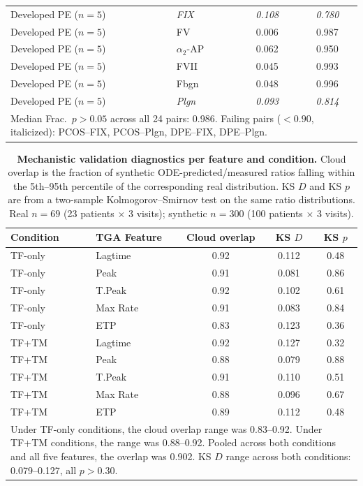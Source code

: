 \begin{table}[ht]
\begin{tabular}{llcc}
Developed PE ($n{=}5$) & \textit{FIX}     & \textit{0.108} & \textit{0.780} \\
Developed PE ($n{=}5$) & FV      & 0.006 & 0.987 \\
Developed PE ($n{=}5$) & $\alpha_2$-AP & 0.062 & 0.950 \\
Developed PE ($n{=}5$) & FVII    & 0.045 & 0.993 \\
Developed PE ($n{=}5$) & Fbgn    & 0.048 & 0.996 \\
Developed PE ($n{=}5$) & \textit{Plgn}    & \textit{0.093} & \textit{0.814} \\
\bottomrule
\multicolumn{4}{p{0.95\textwidth}}{\small Median Frac.\ $p > 0.05$ across all 24 pairs: 0.986. Failing
pairs ($< 0.90$, italicized): PCOS--FIX, PCOS--Plgn, DPE--FIX, DPE--Plgn.}
\end{tabular}
\end{table}

\begin{table}[ht]
\centering
\caption{\textbf{Mechanistic validation diagnostics per feature and
condition.} Cloud overlap is the fraction of synthetic ODE-predicted/measured
ratios falling within the 5th--95th percentile of the corresponding real
distribution. KS $D$ and KS $p$ are from a two-sample Kolmogorov--Smirnov test
on the same ratio distributions. Real $n{=}69$ (23 patients $\times$ 3 visits);
synthetic $n{=}300$ (100 patients $\times$ 3 visits).}
\label{stab:mechanistic-validation}
\begin{tabular}{llccc}
\toprule
Condition & TGA Feature & Cloud overlap & KS $D$ & KS $p$ \\
\midrule
TF-only & Lagtime          & 0.92 & 0.112 & 0.48 \\
TF-only & Peak             & 0.91 & 0.081 & 0.86 \\
TF-only & T.Peak           & 0.92 & 0.102 & 0.61 \\
TF-only & Max Rate         & 0.91 & 0.083 & 0.84 \\
TF-only & ETP              & 0.83 & 0.123 & 0.36 \\
\midrule
TF+TM   & Lagtime          & 0.92 & 0.127 & 0.32 \\
TF+TM   & Peak             & 0.88 & 0.079 & 0.88 \\
TF+TM   & T.Peak           & 0.91 & 0.110 & 0.51 \\
TF+TM   & Max Rate         & 0.88 & 0.096 & 0.67 \\
TF+TM   & ETP              & 0.89 & 0.112 & 0.48 \\
\bottomrule
\multicolumn{5}{p{0.95\textwidth}}{\small Under TF-only conditions, the cloud overlap
range was 0.83--0.92. Under TF+TM conditions, the range was 0.88--0.92. Pooled across both
conditions and all five features, the overlap was 0.902.
KS $D$ range across both conditions: 0.079--0.127, all $p > 0.30$.}
\end{tabular}
\end{table}

